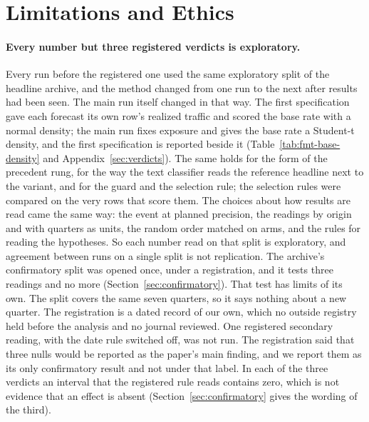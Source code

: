 \section{Limitations and Ethics}
\label{sec:limitations}

\paragraph{Every number but three registered verdicts is exploratory.} Every run before the registered one used the same exploratory split of the headline archive, and the method changed from one run to the next after results had been seen. The main run itself changed in that way. The first specification gave each forecast its own row's realized traffic and scored the base rate with a normal density; the main run fixes exposure and gives the base rate a Student-t density, and the first specification is reported beside it (Table~\ref{tab:fmt-base-density} and Appendix~\ref{sec:verdicts}). The same holds for the form of the precedent rung, for the way the text classifier reads the reference headline next to the variant, and for the guard and the selection rule; the selection rules were compared on the very rows that score them. The choices about how results are read came the same way: the event at planned precision, the readings by origin and with quarters as units, the random order matched on arms, and the rules for reading the hypotheses. So each number read on that split is exploratory, and agreement between runs on a single split is not replication. The archive's confirmatory split was opened once, under a registration, and it tests three readings and no more (Section~\ref{sec:confirmatory}). That test has limits of its own. The split covers the same seven quarters, so it says nothing about a new quarter. The registration is a dated record of our own, which no outside registry held before the analysis and no journal reviewed. One registered secondary reading, with the date rule switched off, was not run. The registration said that three nulls would be reported as the paper's main finding, and we report them as its only confirmatory result and not under that label. In each of the three verdicts an interval that the registered rule reads contains zero, which is not evidence that an effect is absent (Section~\ref{sec:confirmatory} gives the wording of the third).

